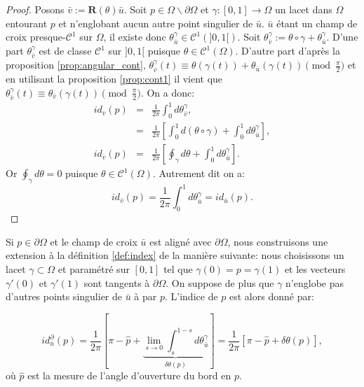 \begin{proof}
Posons $\bar{v}:=\mathbf{R}(\theta)\bar{u}$. Soit $p\in\Omega\backslash\partial\Omega$ et $\gamma:[0, 1]\longrightarrow\Omega$ un lacet dans $\Omega$ entourant $p$ et n'englobant aucun autre point singulier de $\bar{u}$. $\bar{u}$ étant un champ de croix presque-$\mathcal{C}^1$ sur $\Omega$, il existe donc $\theta_{\bar{u}}^\gamma\in\mathcal{C}^1(]0, 1[)$. Soit $\theta_{\bar{v}}^\gamma:=\theta\circ\gamma+\theta_{\bar{u}}^\gamma$. D'une part $\theta_{\bar{v}}^\gamma$ est de classe $\mathcal{C}^1$ sur $]0, 1[$ puisque $\theta\in\mathcal{C}^1(\Omega)$. D'autre part d'après la proposition \ref{prop:angular_cont}, $\theta_{\bar{v}}^\gamma(t)\equiv\theta(\gamma(t))+\theta_{\bar{u}}(\gamma(t))\pmod{\frac{\pi}{2}}$ et en utilisant la proposition \ref{prop:cont1} il vient que $\theta_{\bar{v}}^\gamma(t)\equiv\theta_{\bar{v}}(\gamma(t))\pmod{\frac{\pi}{2}}$. On a donc:
\begin{eqnarray*}
    id_{\bar{v}}(p)&=&\frac{1}{2\pi}\int_0^1 d\theta_{\bar{v}}^\gamma,\\
    &=&\frac{1}{2\pi}\left[\int_0^1 d(\theta\circ\gamma)+\int_0^1 d\theta_{\bar{u}}^\gamma\right],\\
    id_{\bar{v}}(p)&=&\frac{1}{2\pi}\left[\oint_\gamma d\theta+\int_0^1 d\theta_{\bar{u}}^\gamma\right].
\end{eqnarray*}
Or $\oint_\gamma d\theta=0$ puisque $\theta\in\mathcal{C}^1(\Omega)$. Autrement dit on a:
$$id_{\bar{v}}(p)=\frac{1}{2\pi}\int_0^1 d\theta_{\bar{u}}^\gamma=id_{\bar{u}}(p).$$
\end{proof}

Si $p\in\partial\Omega$ et le champ de croix $\bar{u}$ est aligné avec $\partial\Omega$, nous construisons une extension à la définition \ref{def:index} de la manière suivante: nous choisissons un lacet $\gamma\subset\Omega$ et paramétré sur $[0, 1]$ tel que $\gamma(0)=p=\gamma(1)$ et les vecteurs $\gamma'(0)$ et $\gamma'(1)$ sont tangents à $\partial\Omega$. On suppose de plus que $\gamma$ n'englobe pas d'autres points singulier de $\bar{u}$ à par $p$. L'indice de $p$ est alors donné par:

\begin{equation}
id^\partial_{\bar{u}}(p) = \frac{1}{2\pi}\left[\pi-\hat{p}+\underbrace{\lim\limits_{s\rightarrow 0}\int_s^{1-s}d\theta_{\bar{u}}^\gamma}_{\delta\theta(p)}\right]=\frac{1}{2\pi}\left[\pi-\hat{p}+\delta\theta(p)\right],
\label{eqn:Indexboundary}
\end{equation}
où $\hat{p}$ est la mesure de l'angle d'ouverture du bord en $p$. %

